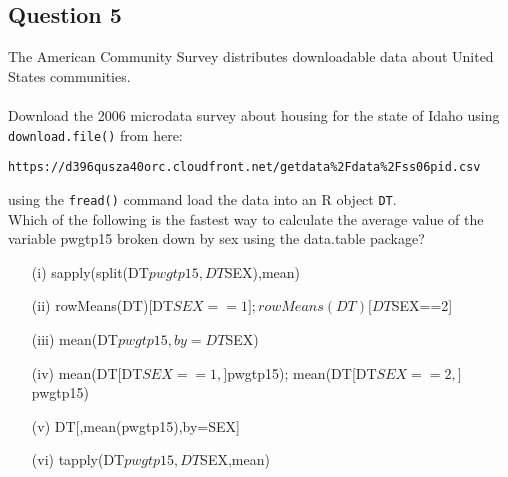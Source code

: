 \documentclass[]{article}
\begin{document}
\newpage
\subsection*{Question 5}
 
The American Community Survey distributes downloadable data about United States communities. \\
\\
Download the 2006 microdata survey about housing for the state of Idaho using \texttt{download.file()} from here:
 
\begin{verbatim}
https://d396qusza40orc.cloudfront.net/getdata%2Fdata%2Fss06pid.csv
\end{verbatim}
 using the \texttt{fread()} command load the data into an R object \texttt{DT}.\\ Which of the following is the fastest way to calculate the average value of the variable pwgtp15  broken down by sex using the data.table package? 

\begin{itemize}
\item[(i)] sapply(split(DT$pwgtp15,DT$SEX),mean) 

\item[(ii)] rowMeans(DT)[DT$SEX==1]; rowMeans(DT)[DT$SEX==2] 

\item[(iii)] mean(DT$pwgtp15,by=DT$SEX) 

\item[(iv)] mean(DT[DT$SEX==1,]$pwgtp15); mean(DT[DT$SEX==2,]$pwgtp15) 

\item[(v)] DT[,mean(pwgtp15),by=SEX] 

\item[(vi)] tapply(DT$pwgtp15,DT$SEX,mean)
\end{itemize}
\end{document}
